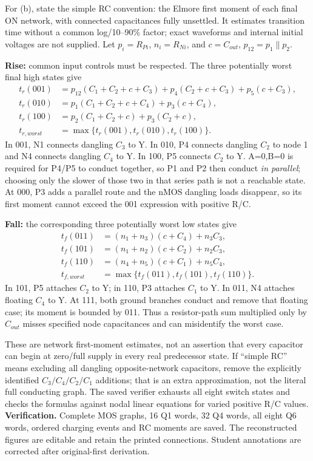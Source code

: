 \documentclass[10pt]{article}
\begin{document}
For (b), state the simple RC convention: the Elmore first moment of each final ON network, with connected capacitances fully unsettled. It estimates transition time without a common log/10--90\% factor; exact waveforms and internal initial voltages are not supplied. Let $p_i=R_{Pi}$, $n_i=R_{Ni}$, and $c=C_{out}$, $p_{12}=p_1\parallel p_2$.

\textbf{Rise:} common input controls must be respected. The three potentially worst final high states give
\begin{align*}
t_r(001)&=p_{12}(C_1+C_2+c+C_3)+p_4(C_2+c+C_3)+p_5(c+C_3),\\
t_r(010)&=p_1(C_1+C_2+c+C_4)+p_3(c+C_4),\\
t_r(100)&=p_2(C_1+C_2+c)+p_3(C_2+c),\\
\boxed{t_{r,worst}}&=\boxed{\max\{t_r(001),t_r(010),t_r(100)\}}.
\end{align*}
In 001, N1 connects dangling $C_3$ to Y. In 010, P4 connects dangling $C_2$ to node 1 and N4 connects dangling $C_4$ to Y. In 100, P5 connects $C_2$ to Y. A=0,B=0 is required for P4/P5 to conduct together, so P1 and P2 then conduct \emph{in parallel}; choosing only the slower of those two in that series path is not a reachable state. At 000, P3 adds a parallel route and the nMOS dangling loads disappear, so its first moment cannot exceed the 001 expression with positive R/C.

\textbf{Fall:} the corresponding three potentially worst low states give
\begin{align*}
t_f(011)&=(n_1+n_3)(c+C_4)+n_3C_3,\\
t_f(101)&=(n_1+n_2)(c+C_2)+n_2C_3,\\
t_f(110)&=(n_4+n_5)(c+C_1)+n_5C_4,\\
\boxed{t_{f,worst}}&=\boxed{\max\{t_f(011),t_f(101),t_f(110)\}}.
\end{align*}
In 101, P5 attaches $C_2$ to Y; in 110, P3 attaches $C_1$ to Y. In 011, N4 attaches floating $C_4$ to Y. At 111, both ground branches conduct and remove that floating case; its moment is bounded by 011. Thus a resistor-path sum multiplied only by $C_{out}$ misses specified node capacitances and can misidentify the worst case.

These are network first-moment estimates, not an assertion that every capacitor can begin at zero/full supply in every real predecessor state. If ``simple RC'' means excluding all dangling opposite-network capacitors, remove the explicitly identified $C_3/C_4/C_2/C_1$ additions; that is an extra approximation, not the literal full conducting graph. The saved verifier exhausts all eight switch states and checks the formulas against nodal linear equations for varied positive R/C values.
\textbf{Verification.} Complete MOS graphs, 16 Q1 words, 32 Q4 words, all eight Q6 words, ordered charging events and RC moments are saved. The reconstructed figures are editable and retain the printed connections. Student annotations are corrected after original-first derivation.
\end{document}
